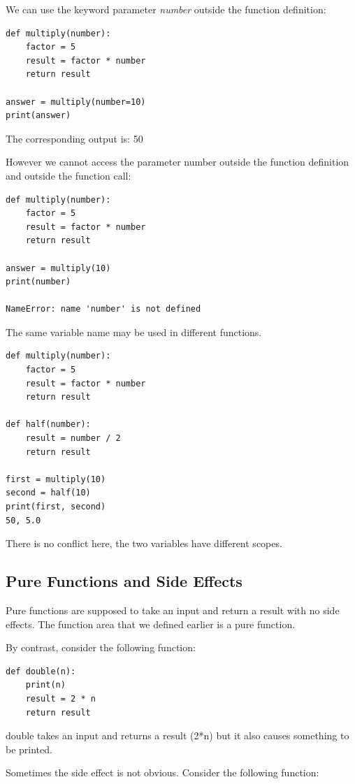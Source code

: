 \documentclass{article}
\begin{document}
We can use the keyword parameter \textit{number} outside the function definition:

\begin{lstlisting} 
def multiply(number):
    factor = 5
    result = factor * number
    return result
 
answer = multiply(number=10)
print(answer)
\end{lstlisting}
 
The corresponding output is: 50
 
However we cannot access the parameter number outside the function definition and outside the function call:

\begin{lstlisting} 
def multiply(number):
    factor = 5
    result = factor * number
    return result
 
answer = multiply(10)
print(number)
 
NameError: name 'number' is not defined
\end{lstlisting}
 
The same variable name may be used in different functions.  

\begin{lstlisting}
def multiply(number):
    factor = 5
    result = factor * number
    return result
 
def half(number):
    result = number / 2
    return result
    
first = multiply(10)
second = half(10)
print(first, second)
50, 5.0
\end{lstlisting}

There is no conflict here, the two variables have different scopes.

\subsection{Pure Functions and Side Effects}

Pure functions are supposed to take an input and return a result with no side effects.  The function area that we defined earlier is a pure function.

By contrast, consider the following function:
\begin{lstlisting}
def double(n):
    print(n)
    result = 2 * n
    return result
\end{lstlisting}
    
double takes an input and returns a result (2*n) but it also causes something to be printed. 

Sometimes the side effect is not obvious.  Consider the following function:
\end{document}
